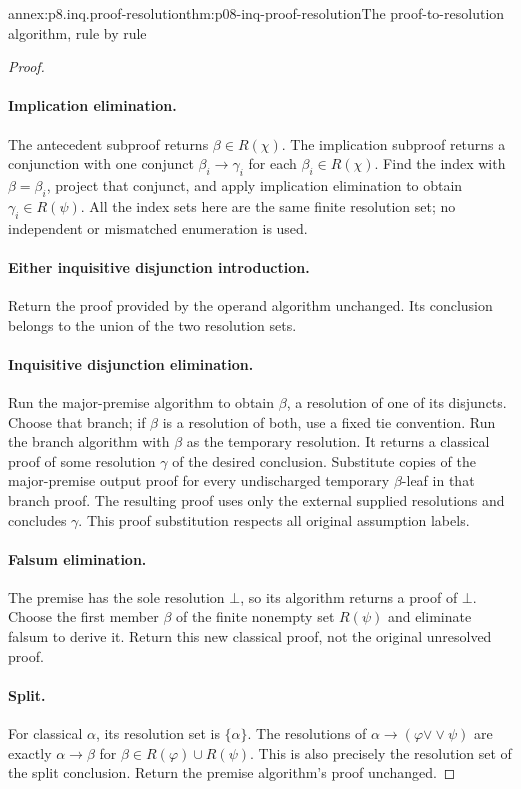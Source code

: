 \begin{annexitem}{annex:p8.inq.proof-resolution}{thm:p08-inq-proof-resolution}{The proof-to-resolution algorithm, rule by rule}
\begin{proof}
\paragraph{Implication elimination.}
The antecedent subproof returns \(\beta\in R(\chi)\). The implication
subproof returns a conjunction with one conjunct
\(\beta_i\to\gamma_i\) for each \(\beta_i\in R(\chi)\).
Find the index with \(\beta=\beta_i\), project that conjunct, and apply
implication elimination to obtain \(\gamma_i\in R(\psi)\).
All the index sets here are the same finite resolution set; no independent
or mismatched enumeration is used.

\paragraph{Either inquisitive disjunction introduction.}
Return the proof provided by the operand algorithm unchanged. Its
conclusion belongs to the union of the two resolution sets.

\paragraph{Inquisitive disjunction elimination.}
Run the major-premise algorithm to obtain \(\beta\), a resolution of
one of its disjuncts. Choose that branch; if \(\beta\) is a resolution
of both, use a fixed tie convention. Run the branch algorithm with
\(\beta\) as the temporary resolution. It returns a classical proof
of some resolution \(\gamma\) of the desired conclusion. Substitute
copies of the major-premise output proof for every undischarged temporary
\(\beta\)-leaf in that branch proof. The resulting proof uses only
the external supplied resolutions and concludes \(\gamma\).
This proof substitution respects all original assumption labels.

\paragraph{Falsum elimination.}
The premise has the sole resolution \(\bot\), so its algorithm returns
a proof of \(\bot\). Choose the first member \(\beta\) of the finite
nonempty set \(R(\psi)\) and eliminate falsum to derive it. Return this
new classical proof, not the original unresolved proof.

\paragraph{Split.}
For classical \(\alpha\), its resolution set is \(\{\alpha\}\).
The resolutions of
\(\alpha\to(\varphi\mathbin{\vee\!\vee}\psi)\) are exactly
\(\alpha\to\beta\) for \(\beta\in R(\varphi)\cup R(\psi)\).
This is also precisely the resolution set of the split conclusion.
Return the premise algorithm's proof unchanged.


\end{proof}
\end{annexitem}

